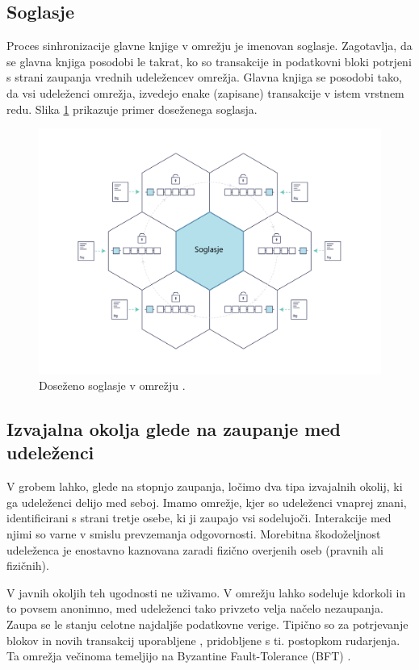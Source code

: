 \documentclass[a4paper, 12pt]{book}
\begin{document}
\subsection{Soglasje}
Proces sinhronizacije glavne knjige v omrežju je imenovan soglasje.
Zagotavlja, da se glavna knjiga posodobi le takrat, ko so transakcije in podatkovni bloki potrjeni s strani zaupanja vrednih udeležencev omrežja.
Glavna knjiga se posodobi tako, da vsi udeleženci omrežja, izvedejo enake (zapisane) transakcije v istem vrstnem redu.
Slika \ref{consensus} prikazuje primer doseženega soglasja.

\begin{figure}[h]
	\includegraphics[width=1.0\textwidth]{slike/consensus.png}
	\caption{Doseženo soglasje v omrežju \cite{hyperledgerDocs}.}
	\label{consensus}
\end{figure}


\subsection{Izvajalna okolja glede na zaupanje med udeleženci}
V grobem lahko, glede na stopnjo zaupanja, ločimo dva tipa izvajalnih okolij, ki ga udeleženci delijo med seboj.
Imamo omrežje, kjer so udeleženci vnaprej znani, identificirani s strani tretje osebe, ki ji zaupajo vsi sodelujoči.
Interakcije med njimi so varne v smislu prevzemanja odgovornosti.
Morebitna škodoželjnost udeleženca je enostavno kaznovana zaradi fizično overjenih oseb (pravnih ali fizičnih).

V javnih okoljih teh ugodnosti ne uživamo.
V omrežju lahko sodeluje kdorkoli in to povsem anonimno,
med udeleženci tako privzeto velja načelo nezaupanja.
Zaupa se le stanju celotne najdaljše podatkovne verige.
Tipično so za potrjevanje blokov in novih transakcij uporabljene , pridobljene s ti. postopkom rudarjenja.
Ta omrežja večinoma temeljijo na Byzantine Fault-Tolerance (BFT) \cite{hyperledgerDocs, castro1999practical}.
\end{document}
